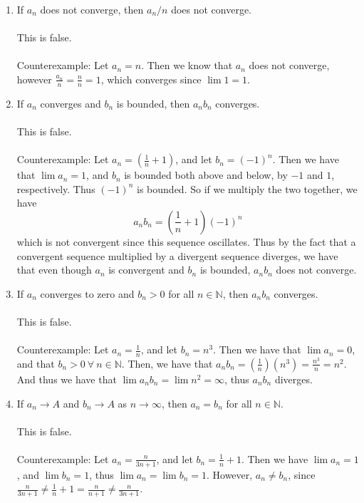 \documentclass[12pt,letterpaper]{article}
\newcommand{\N}{\mathbb{N}}
\theoremstyle{case}
\begin{document}
\begin{enumerate}
\begin{enumerate}
		\item If $a_n$ does not converge, then $a_n/n$ does not converge.
		\\\\This is false.
		\\\\Counterexample: Let $a_n = n$. Then we know that $a_n$ does not converge, however $\frac{a_n}{n} = \frac{n}{n} = 1$, which converges since $\lim 1 = 1$.
		
		\item If $a_n$ converges and $b_n$ is bounded, then $a_nb_n$ converges.
		\\\\This is false.
		\\\\Counterexample: Let $a_n=(\frac{1}{n} + 1)$, and let $b_n = (-1)^n$. Then we have that $\lim a_n = 1$, and $b_n$ is bounded both above and below, by $-1$ and $1$, respectively. Thus $(-1)^n$ is bounded. So if we multiply the two together, we have
		\[a_nb_n = (\frac{1}{n}+1)(-1)^n\]
		which is not convergent since this sequence oscillates. Thus by the fact that a convergent sequence multiplied by a divergent sequence diverges, we have that even though $a_n$ is convergent and $b_n$ is bounded, $a_nb_n$ does not converge.
		
		\item If $a_n$ converges to zero and $b_n > 0$ for all $n \in \mathbb{N}$, then $a_nb_n$ converges.
		\\\\This is false.
		\\\\Counterexample: Let $a_n=\frac{1}{n}$, and let $b_n = n^3$. Then we have that $\lim a_n = 0$, and that $b_n >0\ \forall\ n \in \N$. Then, we have that $a_nb_n=(\frac{1}{n})(n^3) = \frac{n^3}{n} = n^2$. And thus we have that $\lim a_nb_n = \lim n^2 = \infty$, thus $a_nb_n$ diverges.
		
		\item If $a_n \rightarrow A$ and $b_n \rightarrow A$ as $n \rightarrow \infty$, then $a_n = b_n$ for all $n \in \mathbb{N}$.
		\\\\This is false.
		\\\\Counterexample: Let $a_n = \frac{n}{3n+1}$, and let $b_n = \frac{1}{n} + 1$. Then we have $\lim a_n = 1$, and $\lim b_n = 1$, thus $\lim a_n = \lim b_n = 1$. However, $a_n \neq b_n$, since $\frac{n}{3n+1} \neq \frac{1}{n} + 1 = \frac{n}{n + 1} \neq \frac{n}{3n+1}$.
		

\end{enumerate}
\end{enumerate}
\end{document}
